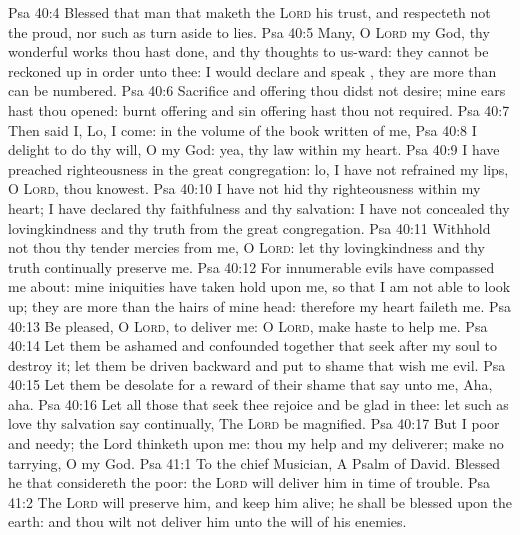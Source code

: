 \vs Psa 40:4 Blessed  that man that maketh the \textsc{Lord} his trust, and respecteth not the proud, nor such as turn aside to lies.
\vs Psa 40:5 Many, O \textsc{Lord} my God,  thy wonderful works  thou hast done, and thy thoughts  to us-ward: they cannot be reckoned up in order unto thee:  I would declare and speak , they are more than can be numbered.
\vs Psa 40:6 Sacrifice and offering thou didst not desire; mine ears hast thou opened: burnt offering and sin offering hast thou not required.
\vs Psa 40:7 Then said I, Lo, I come: in the volume of the book  written of me,
\vs Psa 40:8 I delight to do thy will, O my God: yea, thy law  within my heart.
\vs Psa 40:9 I have preached righteousness in the great congregation: lo, I have not refrained my lips, O \textsc{Lord}, thou knowest.
\vs Psa 40:10 I have not hid thy righteousness within my heart; I have declared thy faithfulness and thy salvation: I have not concealed thy lovingkindness and thy truth from the great congregation.
\vs Psa 40:11 Withhold not thou thy tender mercies from me, O \textsc{Lord}: let thy lovingkindness and thy truth continually preserve me.
\vs Psa 40:12 For innumerable evils have compassed me about: mine iniquities have taken hold upon me, so that I am not able to look up; they are more than the hairs of mine head: therefore my heart faileth me.
\vs Psa 40:13 Be pleased, O \textsc{Lord}, to deliver me: O \textsc{Lord}, make haste to help me.
\vs Psa 40:14 Let them be ashamed and confounded together that seek after my soul to destroy it; let them be driven backward and put to shame that wish me evil.
\vs Psa 40:15 Let them be desolate for a reward of their shame that say unto me, Aha, aha.
\vs Psa 40:16 Let all those that seek thee rejoice and be glad in thee: let such as love thy salvation say continually, The \textsc{Lord} be magnified.
\vs Psa 40:17 But I  poor and needy;  the Lord thinketh upon me: thou  my help and my deliverer; make no tarrying, O my God.
\vs Psa 41:1 To the chief Musician, A Psalm of David. Blessed  he that considereth the poor: the \textsc{Lord} will deliver him in time of trouble.
\vs Psa 41:2 The \textsc{Lord} will preserve him, and keep him alive;  he shall be blessed upon the earth: and thou wilt not deliver him unto the will of his enemies.
